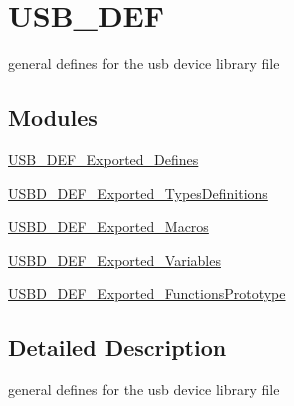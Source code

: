 \hypertarget{group___u_s_b___d_e_f}{\section{U\-S\-B\-\_\-\-D\-E\-F}
\label{group___u_s_b___d_e_f}
}


general defines for the usb device library file  


\subsection*{Modules}
\begin{DoxyCompactItemize}
\item 
\hyperlink{group___u_s_b___d_e_f___exported___defines}{U\-S\-B\-\_\-\-D\-E\-F\-\_\-\-Exported\-\_\-\-Defines}
\item 
\hyperlink{group___u_s_b_d___d_e_f___exported___types_definitions}{U\-S\-B\-D\-\_\-\-D\-E\-F\-\_\-\-Exported\-\_\-\-Types\-Definitions}
\item 
\hyperlink{group___u_s_b_d___d_e_f___exported___macros}{U\-S\-B\-D\-\_\-\-D\-E\-F\-\_\-\-Exported\-\_\-\-Macros}
\item 
\hyperlink{group___u_s_b_d___d_e_f___exported___variables}{U\-S\-B\-D\-\_\-\-D\-E\-F\-\_\-\-Exported\-\_\-\-Variables}
\item 
\hyperlink{group___u_s_b_d___d_e_f___exported___functions_prototype}{U\-S\-B\-D\-\_\-\-D\-E\-F\-\_\-\-Exported\-\_\-\-Functions\-Prototype}
\end{DoxyCompactItemize}


\subsection{Detailed Description}
general defines for the usb device library file 